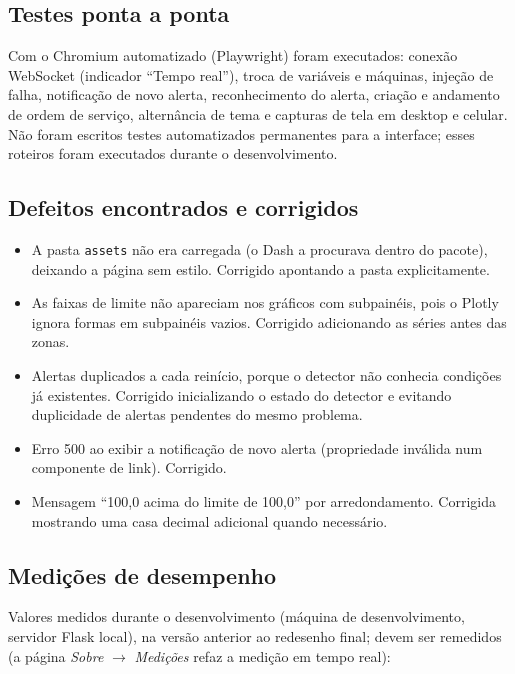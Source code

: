 \documentclass[12pt,a4paper]{article}
\newcommand{\codigo}[1]{\texttt{\small #1}}
\begin{document}
\subsection{Testes ponta a ponta}
Com o Chromium automatizado (Playwright) foram executados: conexão WebSocket (indicador ``Tempo real''), troca de variáveis e máquinas, injeção de falha,
notificação de novo alerta, reconhecimento do alerta, criação e andamento de ordem de serviço, alternância de tema e capturas de tela em desktop e celular.
Não foram escritos testes automatizados permanentes para a interface; esses roteiros foram executados durante o desenvolvimento.

\subsection{Defeitos encontrados e corrigidos}
\begin{itemize}
  \item A pasta \codigo{assets} não era carregada (o Dash a procurava dentro do pacote), deixando a página sem estilo. Corrigido apontando a pasta explicitamente.
  \item As faixas de limite não apareciam nos gráficos com subpainéis, pois o Plotly ignora formas em subpainéis vazios. Corrigido adicionando as séries antes das zonas.
  \item Alertas duplicados a cada reinício, porque o detector não conhecia condições já existentes. Corrigido inicializando o estado do detector e evitando
  duplicidade de alertas pendentes do mesmo problema.
  \item Erro 500 ao exibir a notificação de novo alerta (propriedade inválida num componente de link). Corrigido.
  \item Mensagem ``100,0 acima do limite de 100,0'' por arredondamento. Corrigida mostrando uma casa decimal adicional quando necessário.
\end{itemize}

\subsection{Medições de desempenho}
Valores medidos durante o desenvolvimento (máquina de desenvolvimento, servidor Flask local), na versão anterior ao redesenho final; devem ser remedidos
(a página \emph{Sobre} $\rightarrow$ \emph{Medições} refaz a medição em tempo real):
\end{document}
